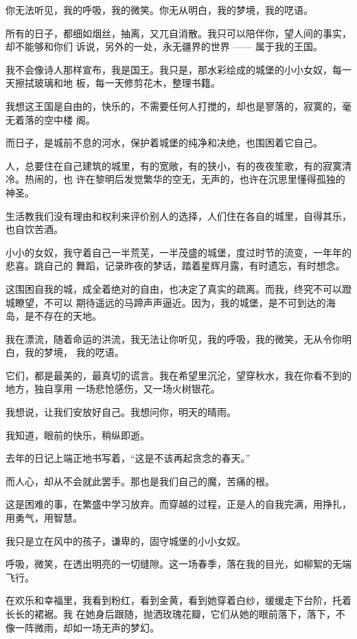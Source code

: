 		你无法听见，我的呼吸，我的微笑。你无从明白，我的梦境，我的呓语。

		所有的日子，都细如烟丝，抽离，又兀自消散。我只可以陪伴你，望人间的事实，却不能够和你们
	诉说，另外的一处，永无疆界的世界 —— 属于我的王国。

		我不会像诗人那样宣布，我是国王。我只是，那水彩绘成的城堡的小小女奴，每一天擦拭玻璃和地
	板，每一天修剪花木，整理书籍。

		我想这王国是自由的，快乐的，不需要任何人打搅的，却也是寥落的，寂寞的，毫无着落的空中楼
	阁。

		而日子，是城前不息的河水，保护着城堡的纯净和决绝，也围困着它自己。

		人，总要住在自己建筑的城里，有的宽敞，有的狭小，有的夜夜笙歌，有的寂寞清冷。热闹的，也
	许在黎明后发觉繁华的空无，无声的，也许在沉思里懂得孤独的神圣。

		生活教我们没有理由和权利来评价别人的选择，人们住在各自的城里，自得其乐，也自饮苦酒。

		小小的女奴，我守着自己一半荒芜，一半茂盛的城堡，度过时节的流变，一年年的悲喜。跳自己的
	舞蹈，记录昨夜的梦话，踏着星辉月露，有时遗忘，有时想念。

		这围困自我的城，成全着绝对的自由，也决定了真实的疏离。而我，终究不可以蹬城瞭望，不可以
	期待遥远的马蹄声声逼近。因为，我的城堡，是不可到达的海岛，是不存在的天地。

		我在漂流，随着命运的洪流，我无法让你听见，我的呼吸，我的微笑，无从令你明白，我的梦境，
	我的呓语。

		它们，都是最美的，最真切的谎言。我在希望里沉沦，望穿秋水，我在你看不到的地方，独自享用
	一场悲怆感伤，又一场火树银花。

		我想说，让我们安放好自己。我想问你，明天的晴雨。

		我知道，眼前的快乐，稍纵即逝。

		去年的日记上端正地书写着，“这是不该再起贪念的春天。”

		而人心，却从不会就此罢手。那也是我们自己的魔，苦痛的根。

		这是困难的事，在繁盛中学习放弃。而穿越的过程，正是人的自我完满，用挣扎，用勇气，用智慧。


		我只是立在风中的孩子，谦卑的，固守城堡的小小女奴。

		呼吸，微笑，在透出明亮的一切缝隙。这一场春季，落在我的目光，如柳絮的无端飞行。

	\endwriting



		在欢乐和幸福里，我看到粉红，看到金黄，看到她穿着白纱，缓缓走下台阶，托着长长的裙裾。我
	在她身后跟随，抛洒玫瑰花瓣，它们从她的眼前落下，落下，不像一阵微雨，却如一场无声的梦幻。

